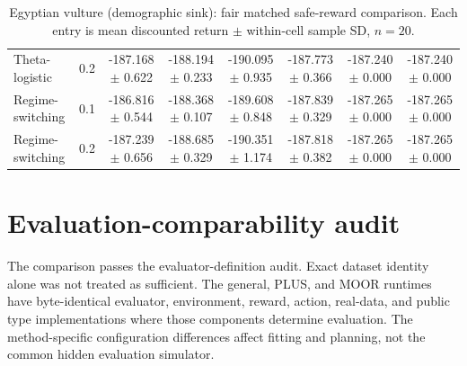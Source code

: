 \documentclass[10pt]{article}
\begin{document}
\begin{table}[p]
\begin{tabular}{@{}lc*{6}{c}@{}}
Theta-logistic & 0.2 & \shortstack{-187.168\\$\pm$ 0.622} & \shortstack{-188.194\\$\pm$ 0.233} & \shortstack{-190.095\\$\pm$ 0.935} & \shortstack{-187.773\\$\pm$ 0.366} & \shortstack{-187.240\\$\pm$ 0.000} & \shortstack{-187.240\\$\pm$ 0.000} \\
\addlinespace[1.5pt]
Regime-switching & 0.1 & \shortstack{-186.816\\$\pm$ 0.544} & \shortstack{-188.368\\$\pm$ 0.107} & \shortstack{-189.608\\$\pm$ 0.848} & \shortstack{-187.839\\$\pm$ 0.329} & \shortstack{-187.265\\$\pm$ 0.000} & \shortstack{-187.265\\$\pm$ 0.000} \\
Regime-switching & 0.2 & \shortstack{-187.239\\$\pm$ 0.656} & \shortstack{-188.685\\$\pm$ 0.329} & \shortstack{-190.351\\$\pm$ 1.174} & \shortstack{-187.818\\$\pm$ 0.382} & \shortstack{-187.265\\$\pm$ 0.000} & \shortstack{-187.265\\$\pm$ 0.000} \\
\bottomrule
\end{tabular}
\caption{Egyptian vulture (demographic sink): fair matched safe-reward comparison. Each entry is mean discounted return $\pm$ within-cell sample SD, $n=20$.}
\end{table}


\clearpage
\section{Evaluation-comparability audit}
The comparison passes the evaluator-definition audit.  Exact dataset identity
alone was not treated as sufficient.  The general, PLUS, and MOOR runtimes have
byte-identical evaluator, environment, reward, action, real-data, and public type
implementations where those components determine evaluation.  The method-specific
configuration differences affect fitting and planning, not the common hidden
evaluation simulator.
\end{document}
